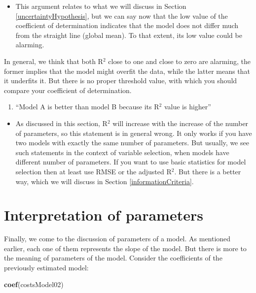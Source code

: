 \documentclass[
]{book}
\newenvironment{Shaded}{\begin{snugshade}}{\end{snugshade}}
\newcommand{\FunctionTok}[1]{\textcolor[rgb]{0.13,0.29,0.53}{\textbf{#1}}}
\newcommand{\NormalTok}[1]{#1}
\providecommand{\tightlist}{%
  \setlength{\itemsep}{0pt}\setlength{\parskip}{0pt}}
\theoremstyle{definition}
\theoremstyle{definition}
\theoremstyle{definition}
\theoremstyle{definition}
\theoremstyle{remark}
\begin{document}
\begin{itemize}
\tightlist
\item
  This argument relates to what we will discuss in Section \ref{uncertaintyHypothesis}, but we can say now that the low value of the coefficient of determination indicates that the model does not differ much from the straight line (global mean). To that extent, its low value could be alarming.
\end{itemize}

In general, we think that both R\(^2\) close to one and close to zero are alarming, the former implies that the model might overfit the data, while the latter means that it underfits it. But there is no proper threshold value, with which you should compare your coefficient of determination.

\begin{enumerate}
\def\labelenumi{\arabic{enumi}.}
\setcounter{enumi}{2}
\tightlist
\item
  ``Model A is better than model B because its R\(^2\) value is higher''
\end{enumerate}

\begin{itemize}
\tightlist
\item
  As discussed in this section, R\(^2\) will increase with the increase of the number of parameters, so this statement is in general wrong. It only works if you have two models with exactly the same number of parameters. But usually, we see such statements in the context of variable selection, when models have different number of parameters. If you want to use basic statistics for model selection then at least use RMSE or the adjusted R\(^2\). But there is a better way, which we will discuss in Section \ref{informationCriteria}.
\end{itemize}

\section{Interpretation of parameters}\label{interpretation-of-parameters}

Finally, we come to the discussion of parameters of a model. As mentioned earlier, each one of them represents the slope of the model. But there is more to the meaning of parameters of the model. Consider the coefficients of the previously estimated model:

\begin{Shaded}
\begin{Highlighting}[]
\FunctionTok{coef}\NormalTok{(costsModel02)}
\end{Highlighting}
\end{Shaded}
\end{document}

